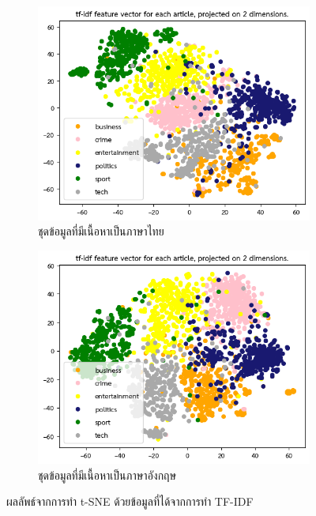 \documentclass[12pt,oneside,openright,a4paper]{cpe-thai-project}
\begin{document}
      \begin{figure}[!ht]\centering
        \begin{subfigure}{0.49\textwidth}
          \includegraphics[width=\linewidth]{./img/thai_stat/tfidf.png} 
          \caption{ชุดข้อมูลที่มีเนื้อหาเป็นภาษาไทย}
          \label{fig:tsne_thai}
        \end{subfigure}
        \begin{subfigure}{0.49\textwidth}
          \includegraphics[width=\linewidth]{./img/eng_stat/tfidf.png}
          \caption{ชุดข้อมูลที่มีเนื้อหาเป็นภาษาอังกฤษ}
          \label{fig:tsne_eng}
        \end{subfigure}
        \caption{ผลลัพธ์จากการทำ t-SNE ด้วยข้อมูลที่ได้จากการทำ TF-IDF}
        \label{fig:tsne}
      \end{figure}
\end{document}
